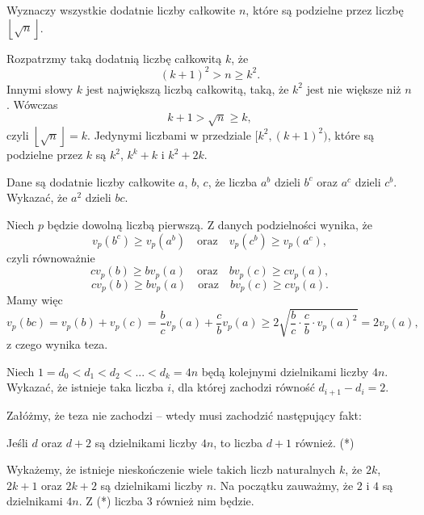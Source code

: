 \newpage
{}

\begin{problem}{1}
	Wyznaczy wszystkie dodatnie liczby całkowite $n$, które są podzielne przez liczbę~$\left\lfloor \sqrt{n} \right\rfloor$.
\end{problem}


\noindent
Rozpatrzmy taką dodatnią liczbę całkowitą $k$, że
\[
	(k + 1)^2 > n \geqslant k^2.
\]
Innymi słowy $k$ jest największą liczbą całkowitą, taką, że $k^2$ jest nie większe niż $n$. Wówczas
\[
	k + 1 > \sqrt{n} \geqslant k,
\]
czyli $\left\lfloor \sqrt{n} \right\rfloor = k$. Jedynymi liczbami w przedziale $[k^2, (k + 1)^2)$, które są podzielne przez $k$ są $k^2$, $k^k + k$ i $k^2 + 2k$.


\begin{problem}{2}
	Dane są dodatnie liczby całkowite $a$, $b$, $c$, że liczba $a^b$ dzieli $b^c$ oraz $a^c$ dzieli $c^b$. Wykazać, że $a^2$ dzieli $bc$.
\end{problem}

\noindent
Niech $p$ będzie dowolną liczbą pierwszą.
Z danych podzielności wynika, że
\[
	v_p(b^c) \geqslant v_p(a^b) \quad \text{oraz} \quad v_p(c^b) \geqslant v_p(a^c),
\]
czyli równoważnie
\[
	cv_p(b) \geqslant bv_p(a) \quad \text{oraz} \quad bv_p(c) \geqslant cv_p(a),
\]
\[
	cv_p(b) \geqslant bv_p(a) \quad \text{oraz} \quad bv_p(c) \geqslant cv_p(a).
\]
Mamy więc
\[
	v_p(bc) = v_p(b) + v_p(c) = \frac{b}{c}v_p(a) +  \frac{c}{b}v_p(a) \geqslant 2\sqrt{\frac{b}{c} \cdot \frac{c}{b} \cdot v_p(a)^2} = 2v_p(a),
\]
z czego wynika teza.


\begin{problem}{3}
	Niech $1 = d_0 < d_1 < d_2 < ... < d_k = 4n$ będą kolejnymi dzielnikami liczby $4n$. Wykazać, że istnieje taka liczba $i$, dla której zachodzi równość $d_{i + 1} - d_i = 2$.
\end{problem}

\noindent
Załóżmy, że teza nie zachodzi -- wtedy musi zachodzić następujący fakt:
\begin{center} 
	Jeśli $d$ oraz $d + 2$ są dzielnikami liczby $4n$, to liczba $d + 1$ również. (*)
\end{center}
Wykażemy, że istnieje nieskończenie wiele takich liczb naturalnych $k$, że $2k$, $2k + 1$ oraz $2k + 2$ są dzielnikami liczby $n$. Na początku zauważmy, że $2$ i $4$ są dzielnikami $4n$. Z (*) liczba $3$ również nim będzie. 

